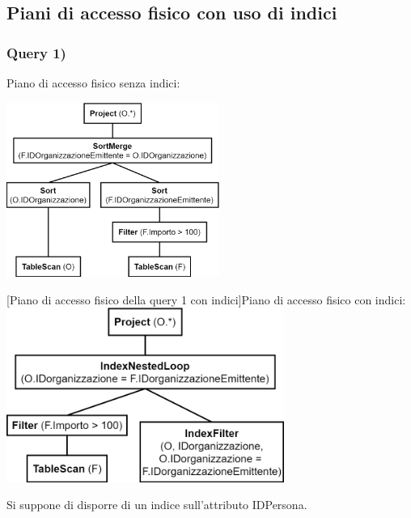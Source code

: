 \documentclass[a4paper,12pt]{article}
\begin{document}
 \subsection{ Piani di accesso fisico con uso di indici }

 \subsubsection{ Query 1) }

\vspace{-0.3cm}\hspace{-0.7cm}
\begin{minipage}{\textwidth}
\begin{multicols}{2}

\null \vfill
Piano di accesso fisico senza indici:

\vspace{0.3cm}\includegraphics[height=5.7cm]{ Albero fisico 1.png }
\vfill \null

\columnbreak

 [Piano di accesso fisico della query 1 con indici]{Piano di accesso fisico con indici:}
\includegraphics[height=5.7cm]{ Albero fisico indici 1.png }

Si suppone di disporre di un indice sull'attributo IDPersona.

\end{multicols}
\end{minipage}
\end{document}
